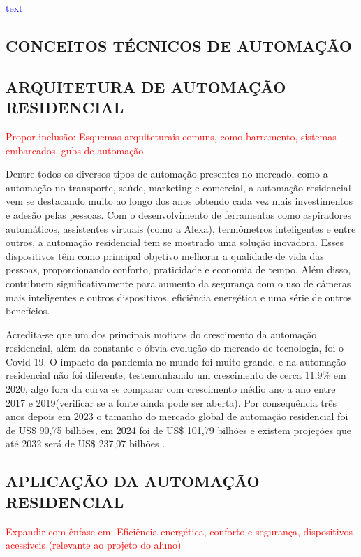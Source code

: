         \textcolor{blue}{text}


    \subsection{CONCEITOS TÉCNICOS DE AUTOMAÇÃO}


    \subsection{ARQUITETURA DE AUTOMAÇÃO RESIDENCIAL}

        \textcolor{red}{Propor inclusão: Esquemas arquiteturais comuns, como barramento, sistemas embarcados, gubs de automação}
    
        Dentre todos os diversos tipos de automação presentes no mercado, como a automação no transporte, saúde, marketing e comercial, a automação residencial vem se destacando muito ao longo dos anos obtendo cada vez mais investimentos e adesão pelas pessoas. Com o desenvolvimento de ferramentas como aspiradores automáticos, assistentes virtuais (como a Alexa), termômetros inteligentes e entre outros, a automação residencial tem se mostrado uma solução inovadora. Esses dispositivos têm como principal objetivo melhorar a qualidade de vida das pessoas, proporcionando conforto, praticidade e economia de tempo. Além disso, contribuem significativamente para aumento da segurança com o uso de câmeras mais inteligentes e outros dispositivos, eficiência energética e uma série de outros benefícios\cite{automacaoResidencial}.

        Acredita-se que um dos principais motivos do crescimento da automação residencial, além da constante e óbvia evolução do mercado de tecnologia, foi o Covid-19. O impacto da pandemia no mundo foi muito grande, e na automação residencial não foi diferente, testemunhando um crescimento de cerca 11,9\% em 2020, algo fora da curva se comparar com crescimento médio ano a ano entre 2017 e 2019\cite{automacaoCovid}(verificar se a fonte ainda pode ser aberta). Por consequência três anos depois em 2023 o tamanho do mercado global de automação residencial foi de US\$ 90,75 bilhões, em 2024 foi de US\$ 101,79 bilhões e existem projeções que até 2032 será de US\$ 237,07 bilhões \cite{automacaoDepoisCovid}.
        
    
    \subsection{APLICAÇÃO DA AUTOMAÇÃO RESIDENCIAL}
        \textcolor{red}{Expandir com ênfase em: Eficiência energética, conforto e segurança, dispositivos acessíveis (relevante ao projeto do aluno)}
    

